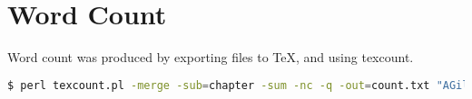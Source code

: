 
\chapter*{Word Count}

%

%
Word count was produced by exporting \LyX{} files to \TeX{}, and using
texcount.

%
\begin{lstlisting}[basicstyle={\ttfamily},breaklines=true,language=bash]
$ perl texcount.pl -merge -sub=chapter -sum -nc -q -out=count.txt "AGillman Thesis.tex"
\end{lstlisting}


%

